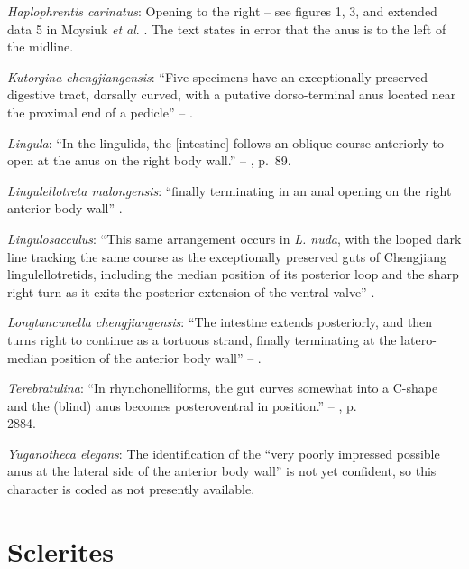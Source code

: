 \documentclass[openany]{book}
\begin{document}
\hypertarget{Haplophrentis_carinatus-coding-64}{}
\emph{Haplophrentis carinatus}: Opening to the right -- see figures 1,
3, and extended data 5 in Moysiuk \emph{et al}.
\citeyearpar{Moysiuk2017Hyolithsare}. The text states in error that the
anus is to the left of the midline.

\hypertarget{Kutorgina_chengjiangensis-coding-64}{}
\emph{Kutorgina chengjiangensis}: ``Five specimens have an exceptionally
preserved digestive tract, dorsally curved, with a putative
dorso-terminal anus located near the proximal end of a pedicle'' --
\citet{Zhang2007Rhynchonelliformeanbrachiopods}.

\hypertarget{Lingula-coding-64}{}
\emph{Lingula}: ``In the lingulids, the {[}intestine{]} follows an
oblique course anteriorly to open at the anus on the right body wall.''
-- \citet{Williams1997Introduction}, p.~89.

\hypertarget{Lingulellotreta_malongensis-coding-64}{}
\emph{Lingulellotreta malongensis}: ``finally terminating in an anal
opening on the right anterior body wall'' \citep[p.66]{Zhang2007Noteon}.

\hypertarget{Lingulosacculus-coding-64}{}
\emph{Lingulosacculus}: ``This same arrangement occurs in \emph{L.
nuda}, with the looped dark line tracking the same course as the
exceptionally preserved guts of Chengjiang lingulellotretids, including
the median position of its posterior loop and the sharp right turn as it
exits the posterior extension of the ventral valve''
\citep[p.310]{Balthasar2009EarlyCambrian}.

\hypertarget{Longtancunella_chengjiangensis-coding-64}{}
\emph{Longtancunella chengjiangensis}: ``The intestine extends
posteriorly, and then turns right to continue as a tortuous strand,
finally terminating at the latero-median position of the anterior body
wall'' -- \citet{Zhang2007Agregarious}.

\hypertarget{Terebratulina-coding-64}{}
\emph{Terebratulina}: ``In rhynchonelliforms, the gut curves somewhat
into a C-shape and the (blind) anus becomes posteroventral in
position.'' -- \citet{Williams2007Supplement}, p.\\
2884.

\hypertarget{Yuganotheca_elegans-coding-64}{}
\emph{Yuganotheca elegans}: The identification of the ``very poorly
impressed possible anus at the lateral side of the anterior body wall''
is not yet confident, so this character is coded as not presently
available.

\section{Sclerites}\label{sclerites}
\end{document}
